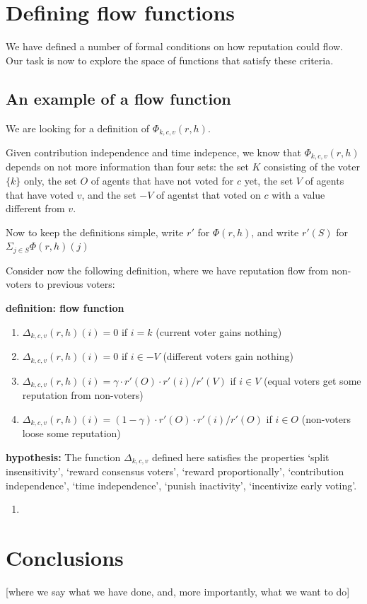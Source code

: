 \documentclass{article}
\newcommand{\flow}{\Phi}
\begin{document}
\section{Defining flow functions}

We have defined a number of formal conditions on how reputation could flow. Our task is now to explore the space of functions that satisfy these criteria.

\subsection{An example of a flow function}


We are looking for a definition of $\Phi_{k,c,v}(r, h)$.

Given contribution independence and time indepence, we know that  $\Phi_{k,c,v}(r, h)$ depends on not more information than four sets: the set $K$ consisting of the voter $\{k\}$ only, the set $O$ of agents that have not voted for $c$ yet, the set $V$ of agents that have voted $v$, and the set $-V$ of agentst that voted on $c$ with a value different from $v$.

Now to keep the definitions simple, write $r'$ for $\flow(r, h)$, and write $r'(S)$ for $\Sigma_{j\in S}\flow(r, h)(j)$

Consider now the following definition, where we have reputation flow from non-voters to previous voters:

{\bf definition: flow function}
\begin{enumerate}
\item $\Delta_{k,c,v}(r,h)(i) = 0$ if $i=k$ (current voter gains nothing)
\item $\Delta_{k,c,v}(r,h)(i) = 0$ if $i \in -V$ (different voters gain nothing)
\item $\Delta_{k,c,v}(r,h)(i) = \gamma \cdot r'(O) \cdot r'(i) / r'(V)$ 
if $i \in V$ (equal voters get some reputation from non-voters)
\item $\Delta_{k,c,v}(r,h)(i) = (1-\gamma) \cdot
r'(O)
\cdot r'(i) / 
r'(O) $ if $i \in O$ (non-voters loose some reputation)
\end{enumerate}
{\bf hypothesis:} The function $\Delta_{k, c, v}$ defined here satisfies the properties `split insensitivity', `reward consensus voters', `reward proportionally', `contribution independence',  `time independence',  `punish inactivity', `incentivize early voting'.
\begin{enumerate}
\item 

\end{enumerate}


\section{Conclusions}
[where we say what we have done, and, more importantly, what we want to do]
\end{document}
